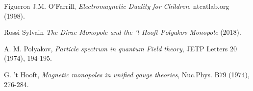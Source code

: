 \clearpage
{}
{}


\begin{thebibliography}{99}

Figueroa J.M. O'Farrill, \emph{Electromagnetic Duality for Children}, ntcatlab.org
(1998).

Rossi Sylvain \emph{The Dirac Monopole and the 't Hooft-Polyakov Monopole}  (2018).

A. M. Polyakov, \emph{Particle spectrum in quantum Field theory}, JETP Letters 20 (1974), 194-195.

G. 't Hooft, \emph{Magnetic monopoles in unified gauge theories}, Nuc.Phys. B79 (1974), 276-284.


\end{thebibliography}